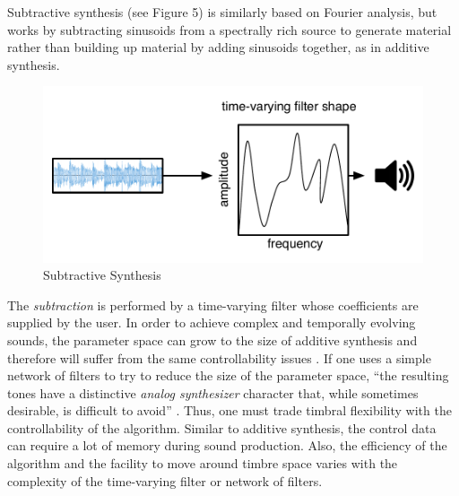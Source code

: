 \documentclass[12pt]{report} 	%
\numberwithin{figure}{chapter}
\numberwithin{table}{chapter}
\numberwithin{equation}{chapter}
\begin{document}
\begin{flushleft}
Subtractive synthesis (see Figure 5) is similarly based on Fourier analysis, but works by subtracting sinusoids from a spectrally rich source to generate material rather than building up material by adding sinusoids together, as in additive synthesis. 
\begin{figure}[h!]
\begin{center}
\includegraphics[scale=0.8]{SubtractiveSynthesis}
\caption[Subtractive synthesis]{Subtractive Synthesis}
\end{center}
\end{figure}
The \textit{subtraction} is performed by a time-varying filter whose coefficients are supplied by the user. In order to achieve complex and temporally evolving sounds, the parameter space can grow to the size of additive synthesis and therefore will suffer from the same controllability issues \cite[p. 48]{Tolonen:1998bh}. If one uses a simple network of filters to try to reduce the size of the parameter space, ``the resulting tones have a distinctive \textit{analog synthesizer} character that, while sometimes desirable, is difficult to avoid'' \cite[p. 5]{Vercoe:1998hh}. Thus, one must trade timbral flexibility with the controllability of the algorithm. Similar to additive synthesis, the control data can require a lot of memory during sound production. Also, the efficiency of the algorithm and the facility to move around timbre space varies with the complexity of the time-varying filter or network of filters.


\end{flushleft}
\end{document}

